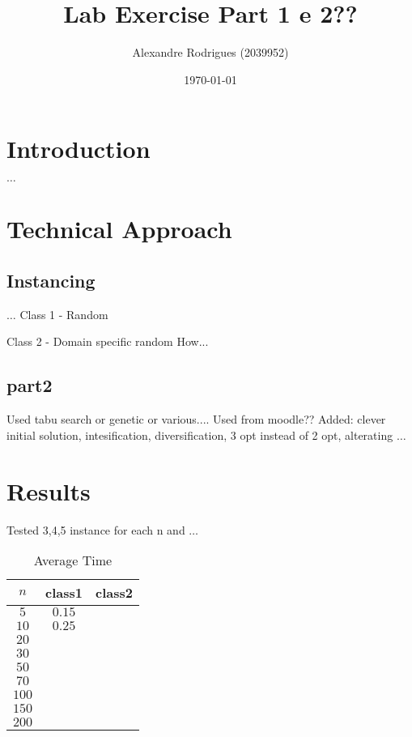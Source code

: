 \documentclass[a4paper, 11pt]{article}
\begin{document}
	
	\title{Lab Exercise Part 1 e 2?? }
	\author{{\small Alexandre Rodrigues (2039952)}}
	\date{\today}
	\maketitle
	
	\section{Introduction}
		$\ldots$
		
	\section{Technical Approach}
		
		
		\subsection{Instancing}
			$\ldots$
			Class 1 - Random
			
			Class 2 - Domain specific random
				How...
				
		\subsection{part2}
			Used tabu search or genetic or various....
			Used from moodle?? Added: clever initial solution, intesification, diversification, 3 opt instead of 2 opt, alterating $\ldots$	
			
	
	\section{Results}
	
	Tested 3,4,5 instance for each n and $\ldots$
	\begin{table}[H]
		\centering
		\begin{tabular}{c|c|c}
			\textbf{$ n $} 	& \textbf{class1} & \textbf{class2}  \\ \hline
			$ 5  $			& $ 0.15 $ 			& $  $ \\ \hline
			$ 10  $			& $ 0.25 $ 			& $ $ \\ \hline
			$ 20  $			& $  $ 			& $  $ \\ \hline
			$ 30  $			& $  $	 		& $  $ \\ \hline
			$ 50  $			& $  $	 		& $  $ \\ \hline
			$ 70  $			& $  $	 		& $  $ \\ \hline
			$ 100 $			& $  $	 		& $  $ \\ \hline
			$ 150 $			& $  $	 		& $  $ \\ \hline
			$ 200 $			& $  $ 			& $  $ \\ 
		\end{tabular}
		\caption{Average Time}
		\label{table:times}
	\end{table}
	
\end{document}
